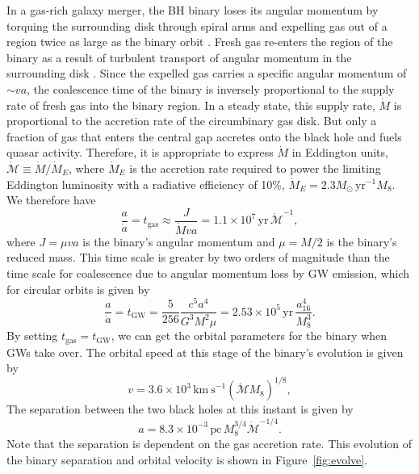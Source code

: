 \documentclass[a4paper,fleqn,usenatbib]{mnras}
\begin{document}
In a gas-rich galaxy merger, the BH binary loses its angular
momentum by torquing the surrounding disk through spiral arms and
expelling gas out of a region twice as large as the binary orbit
\citep{2005ApJ...622L..93M, 2007PASJ...59..427H, 2008ApJ...672...83M,
  2009MNRAS.393.1423C}.  Fresh gas re-enters the region of the binary
as a result of turbulent transport of angular momentum in the
surrounding disk \citep{2008ApJ...672...83M, 2012ApJ...755...51N,
  2012MNRAS.427.2680K, 2012A&A...545A.127R}.  Since the expelled gas
carries a specific angular momentum of $\sim va$, the coalescence time
of the binary is inversely proportional to the supply rate of fresh
gas into the binary region.  In a steady state, this supply rate,
$\dot M$ is proportional to the accretion rate of the circumbinary gas
disk.  But only a fraction of gas that enters the central gap accretes
onto the black hole and fuels quasar activity.  Therefore, it is
appropriate to express $\dot M$ in Eddington units, $\dot{\mathcal
  M}\equiv\dot M /\dot M_E$, where $\dot M_E$ is the accretion rate
required to power the limiting Eddington luminosity with a radiative
efficiency of 10\%, $\dot M_E=2.3 M_\odot\, \mathrm{yr}^{-1}M_8$.  We
therefore have \citep{2010PhRvD..81d7503L}
\begin{equation}
  \frac{a}{\dot a} = t_\mathrm{gas}\approx\frac{J}{\dot Mva}=1.1\times 10^7\,
  \mathrm{yr}\,\dot{\mathcal M}^{-1},
\end{equation}
where $J=\mu va$ is the binary's angular momentum and $\mu=M/2$ is the
binary's reduced mass.  This time scale is greater by two orders of
magnitude than the time scale for coalescence due to angular momentum
loss by GW emission, which for circular orbits is given by
\citep{1964PhRv..136.1224P}
\begin{equation}
\frac{a}{\dot a} = t_\mathrm{GW} = \frac{5}{256}\frac{c^5a^4}{G^3M^2\mu}=2.53\times 10^5\,\mathrm{yr}\,\frac{a_{16}^4}{M_8^3}.
\end{equation}
By setting $t_\mathrm{gas}=t_\mathrm{GW}$, we can get the orbital
parameters for the binary when GWs take over.  The orbital speed at
this stage of the binary's evolution is given by
\begin{equation}
  v = 3.6\times 10^3\, \mathrm{km~s}^{-1}(\dot{\mathcal{M}}M_8)^{1/8},
  \label{eqn:v}
\end{equation}
The separation between the two black holes at this instant is given by
\begin{equation}
  a = 8.3\times 10^{-3}\, \mathrm{pc}\, M_8^{3/4}\dot{\mathcal{M}}^{-1/4}.
  \label{eqn:a}
\end{equation}
Note that the separation is dependent on the gas accretion rate.  This
evolution of the binary separation and orbital velocity is shown in
Figure~\ref{fig:evolve}.
\end{document}
